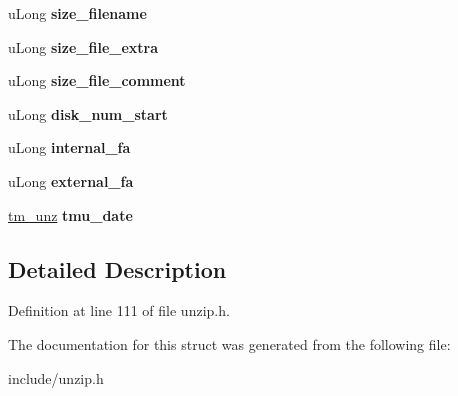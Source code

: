 \begin{DoxyCompactItemize}
\item 
\hypertarget{structunz__file__info64__s_ac09e3b96910b5f98ec73688116b6b3fd}{u\-Long {\bfseries size\-\_\-filename}}\label{structunz__file__info64__s_ac09e3b96910b5f98ec73688116b6b3fd}

\item 
\hypertarget{structunz__file__info64__s_a12af3fa77dc4f7f28448d68703eb8c18}{u\-Long {\bfseries size\-\_\-file\-\_\-extra}}\label{structunz__file__info64__s_a12af3fa77dc4f7f28448d68703eb8c18}

\item 
\hypertarget{structunz__file__info64__s_aff23e3bb5b9a3a8a26aa4f4cfcca7c9c}{u\-Long {\bfseries size\-\_\-file\-\_\-comment}}\label{structunz__file__info64__s_aff23e3bb5b9a3a8a26aa4f4cfcca7c9c}

\item 
\hypertarget{structunz__file__info64__s_ad6ed48daf96d59f810a1ef5167ad39db}{u\-Long {\bfseries disk\-\_\-num\-\_\-start}}\label{structunz__file__info64__s_ad6ed48daf96d59f810a1ef5167ad39db}

\item 
\hypertarget{structunz__file__info64__s_a408c5cd87b4894359e91dcab506212cc}{u\-Long {\bfseries internal\-\_\-fa}}\label{structunz__file__info64__s_a408c5cd87b4894359e91dcab506212cc}

\item 
\hypertarget{structunz__file__info64__s_ac9e0fa204fc992beb62b86163f4736ac}{u\-Long {\bfseries external\-\_\-fa}}\label{structunz__file__info64__s_ac9e0fa204fc992beb62b86163f4736ac}

\item 
\hypertarget{structunz__file__info64__s_a9bf3787641ee4345df714293ee31c51e}{\hyperlink{structtm__unz__s}{tm\-\_\-unz} {\bfseries tmu\-\_\-date}}\label{structunz__file__info64__s_a9bf3787641ee4345df714293ee31c51e}

\end{DoxyCompactItemize}


\subsection{Detailed Description}


Definition at line 111 of file unzip.\-h.



The documentation for this struct was generated from the following file\-:\begin{DoxyCompactItemize}
\item 
include/unzip.\-h\end{DoxyCompactItemize}
